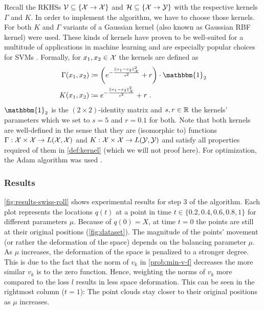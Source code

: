 Recall the RKHSs $\mathcal{V} \subseteq \{\mathcal{X} \rightarrow \mathcal{X}\}$ and $\mathcal{H} \subseteq \{\mathcal{X} \rightarrow \mathcal{Y}\}$ with the respective kernels $\Gamma$ and $K$.
In order to implement the algorithm, we have to choose those kernels.
For both $K$ and $\Gamma$ variants of a Gaussian kernel (also known as Gaussian RBF kernel) were used.
These kinds of kernels have proven to be well-suited for a multitude of applications in machine learning and are especially popular choices for SVMs \cite{steinwart08}. 
Formally, for $x_1, x_2 \in \mathcal{X}$ the kernels are defined as
\begin{align}
	\Gamma(x_1, x_2) &\coloneqq \left(e^{-\frac{\norm{x_1 - x_2}_\cX^2}{s^2}} + r\right) \cdot \mathbbm{1}_2\\
	K(x_1, x_2) &\coloneqq e^{-\frac{\norm{x_1 - x_2}_\cX^2}{s^2}} + r \ .
\end{align}
$\mathbbm{1}_2$ is the $(2\times2)$-identity matrix and $s, r \in \mathbb{R}$ the kernels' parameters which we set to $s = 5$ and $r = 0.1$ for both.
Note that both kernels are well-defined in the sense that they are (isomorphic to) functions $\Gamma: \mathcal{X} \times \mathcal{X} \rightarrow L(\mathcal{X}, \mathcal{X})$ and $K: \mathcal{X} \times \mathcal{X} \rightarrow L(\mathcal{Y}, \mathcal{Y})$ and satisfy all properties required of them in \cref{def:kernel} (which we will not proof here).
For optimization, the Adam algorithm was used \cite{kingma17}.

\subsubsection{Results}



\cref{fig:results-swiss-roll} shows experimental results for step 3 of the algorithm.
Each plot represents the locations $q(t)$ at a point in time $t \in \{0.2, 0.4, 0.6, 0.8, 1\}$ for different parameters $\mu$.
Because of $q(0) = X$, at time $t = 0$ the points are still at their original positions (\cref{fig:dataset}).
The magnitude of the points' movement (or rather the deformation of the space) depends on the balancing parameter $\mu$.
As $\mu$ increases, the deformation of the space is penalized to a stronger degree.
This is due to the fact that the norm of $v_k$ in \cref{prob:min-v-f} decreases the more similar $v_k$ is to the zero function.
Hence, weighting the norms of $v_k$ more compared to the loss $l$ results in less space deformation.
This can be seen in the rightmost column ($t=1$):
The point clouds stay closer to their original positions as $\mu$ increases.

